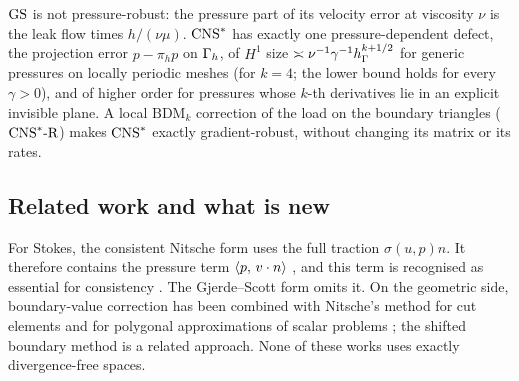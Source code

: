\begin{theoremT}
$\mathrm{GS}$ is not pressure-robust: the pressure part of its velocity error at viscosity $\nu$ is the leak flow times $h/(\nu\mu)$. $\mathrm{CNS}^\ast$ has exactly one pressure-dependent defect, the projection error $p-\pi_hp$ on $\Gamma_h$, of $H^1$ size $\asymp\nu^{-1}\gamma^{-1}h_\Gamma^{k+1/2}$ for generic pressures on locally periodic meshes (for $k=4$; the lower bound holds for every $\gamma>0$), and of higher order for pressures whose $k$-th derivatives lie in an explicit invisible plane. A local $\mathrm{BDM}_k$ correction of the load on the boundary triangles ($\mathrm{CNS}^\ast\text{-R}$) makes $\mathrm{CNS}^\ast$ exactly gradient-robust, without changing its matrix or its rates.
\end{theoremT}

\subsection*{Related work and what is new}
For Stokes, the consistent Nitsche form uses the full traction $\sigma(u,p)n$. It therefore contains the pressure term $\langle p,\, v\cdot n\rangle$ \cite{FreundStenberg1995,Stenberg1995,Becker2002,BurmanHansbo2014}, and this term is recognised as essential for consistency \cite{BurmanHansboLarson2019Stokes}. The Gjerde--Scott form omits it. On the geometric side, boundary-value correction \cite{BrambleDupontThomee1972} has been combined with Nitsche's method for cut elements \cite{BurmanHansboLarson2018,BurmanHansboLarson2019Stokes} and for polygonal approximations of scalar problems \cite{DupontGuzmanScott2025}; the shifted boundary method \cite{MainScovazzi2018} is a related approach. None of these works uses exactly divergence-free spaces.

